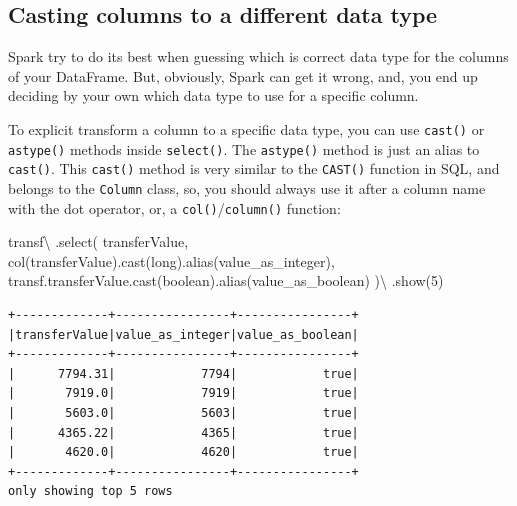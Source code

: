 \documentclass[
  11pt,
  letterpaper,
  DIV=11,
  numbers=noendperiod]{scrreprt}
\newenvironment{Shaded}{\begin{snugshade}}{\end{snugshade}}
\newcommand{\DecValTok}[1]{\textcolor[rgb]{0.68,0.00,0.00}{#1}}
\newcommand{\NormalTok}[1]{\textcolor[rgb]{0.00,0.23,0.31}{#1}}
\newcommand{\OperatorTok}[1]{\textcolor[rgb]{0.37,0.37,0.37}{#1}}
\newcommand{\StringTok}[1]{\textcolor[rgb]{0.13,0.47,0.30}{#1}}
\begin{document}
\hypertarget{casting-columns-to-a-different-data-type}{%
\subsection{Casting columns to a different data
type}\label{casting-columns-to-a-different-data-type}}

Spark try to do its best when guessing which is correct data type for
the columns of your DataFrame. But, obviously, Spark can get it wrong,
and, you end up deciding by your own which data type to use for a
specific column.

To explicit transform a column to a specific data type, you can use
\texttt{cast()} or \texttt{astype()} methods inside \texttt{select()}.
The \texttt{astype()} method is just an alias to \texttt{cast()}. This
\texttt{cast()} method is very similar to the \texttt{CAST()} function
in SQL, and belongs to the \texttt{Column} class, so, you should always
use it after a column name with the dot operator, or, a
\texttt{col()}/\texttt{column()} function:

\begin{Shaded}
\begin{Highlighting}[]
\NormalTok{transf}\OperatorTok{\textbackslash{}}
\NormalTok{  .select(}
    \StringTok{\textquotesingle{}transferValue\textquotesingle{}}\NormalTok{,}
\NormalTok{    col(}\StringTok{\textquotesingle{}transferValue\textquotesingle{}}\NormalTok{).cast(}\StringTok{\textquotesingle{}long\textquotesingle{}}\NormalTok{).alias(}\StringTok{\textquotesingle{}value\_as\_integer\textquotesingle{}}\NormalTok{),}
\NormalTok{    transf.transferValue.cast(}\StringTok{\textquotesingle{}boolean\textquotesingle{}}\NormalTok{).alias(}\StringTok{\textquotesingle{}value\_as\_boolean\textquotesingle{}}\NormalTok{)}
\NormalTok{  )}\OperatorTok{\textbackslash{}}
\NormalTok{  .show(}\DecValTok{5}\NormalTok{)}
\end{Highlighting}
\end{Shaded}

\begin{verbatim}
+-------------+----------------+----------------+
|transferValue|value_as_integer|value_as_boolean|
+-------------+----------------+----------------+
|      7794.31|            7794|            true|
|       7919.0|            7919|            true|
|       5603.0|            5603|            true|
|      4365.22|            4365|            true|
|       4620.0|            4620|            true|
+-------------+----------------+----------------+
only showing top 5 rows
\end{verbatim}
\end{document}
